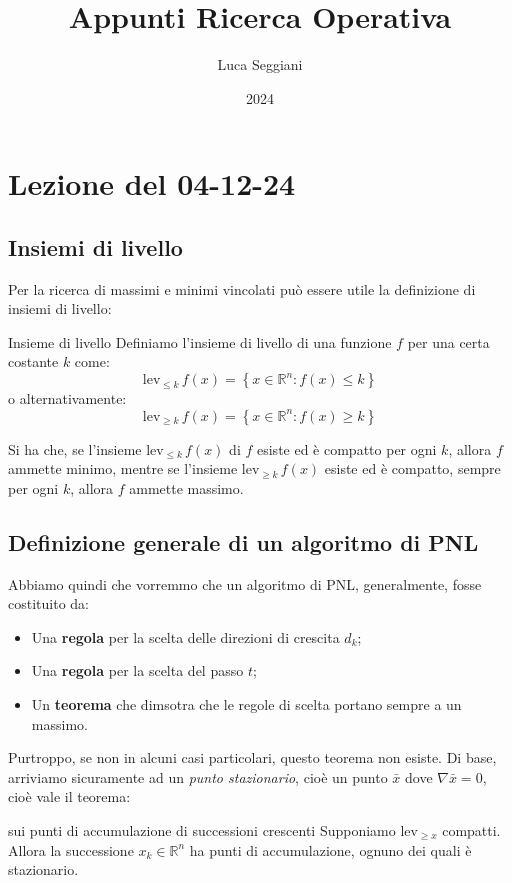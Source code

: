 \documentclass[a4paper,11pt]{article}
\title{Appunti Ricerca Operativa}
\author{Luca Seggiani}
\date{2024}
\begin{document}
\section{Lezione del 04-12-24}

\thispagestyle{empty}
\pagestyle{fancy}

\subsection{Insiemi di livello}
Per la ricerca di massimi e minimi vincolati può essere utile la definizione di insiemi di livello:
\begin{definition}{Insieme di livello}
	Definiamo l'insieme di livello di una funzione $f$ per una certa costante $k$ come:
	$$
	\mathrm{lev}_{\leq k} \, f(x) = \left\{ x \in \mathbb{R}^n: f(x) \leq k \right\}
	$$
	o alternativamente:
	$$
	\mathrm{lev}_{\geq k} \, f(x) = \left\{ x \in \mathbb{R}^n: f(x) \geq k \right\}
	$$
\end{definition}

Si ha che, se l'insieme $\mathrm{lev}_{\leq k} \, f(x)$ di $f$ esiste ed è compatto per ogni $k$, allora $f$ ammette minimo, mentre se l'insieme $\mathrm{lev}_{\geq k} \, f(x)$  esiste ed è compatto, sempre per ogni $k$, allora $f$ ammette massimo.

\subsection{Definizione generale di un algoritmo di PNL}
Abbiamo quindi che vorremmo che un algoritmo di PNL, generalmente, fosse costituito da:
\begin{itemize}
	\item Una \textbf{regola} per la scelta delle direzioni di crescita $d_k$;
	\item Una \textbf{regola} per la scelta del passo $t$;
	\item Un \textbf{teorema} che dimsotra che le regole di scelta portano sempre a un massimo.
\end{itemize}

Purtroppo, se non in alcuni casi particolari, questo teorema non esiste.
Di base, arriviamo sicuramente ad un \textit{punto stazionario}, cioè un punto $\bar{x}$ dove $\nabla \bar{x} = 0$, cioè vale il teorema:
\begin{theorem}{sui punti di accumulazione di successioni crescenti}
	Supponiamo $\mathrm{lev}_{\geq x}$ compatti.
	Allora la successione $x_k \in \mathbb{R}^n$ ha punti di accumulazione, ognuno dei quali è stazionario.
\end{theorem}
\end{document}
